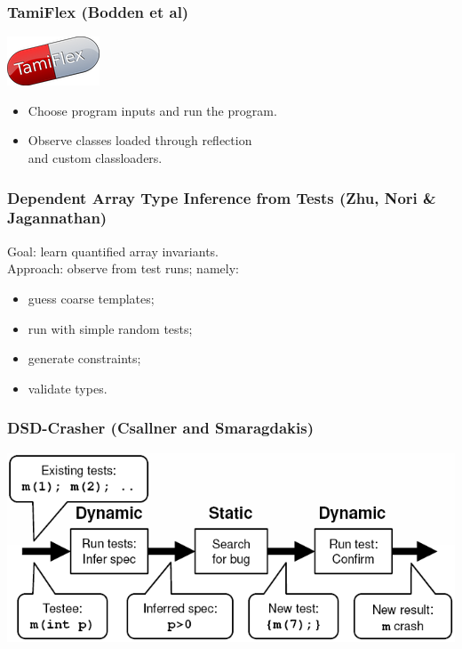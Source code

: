 \documentclass{beamer}
\newenvironment{changemargin}[1]{%
  \begin{list}{}{%
    \setlength{\topsep}{0pt}%
    \setlength{\leftmargin}{#1}%
    \setlength{\rightmargin}{1em}
    \setlength{\listparindent}{\parindent}%
    \setlength{\itemindent}{\parindent}%
    \setlength{\parsep}{\parskip}%
  }%
  \item[]}{\end{list}}
\begin{document}
\begin{frame}
  \frametitle{TamiFlex (Bodden et al)}

\begin{center}
\includegraphics[width=.2\textwidth]{images/tamiflex.png}
\end{center}

\Large
\begin{changemargin}{1cm}
\begin{itemize}
\item Choose program inputs and run the program.
\item Observe classes loaded through reflection \\
 \hspace*{2em} and custom classloaders.
\end{itemize}
\end{changemargin}

\end{frame}

\begin{frame}
  \frametitle{Dependent Array Type Inference from Tests (Zhu, Nori \& Jagannathan)}

\begin{changemargin}{1cm}
\Large
Goal: learn quantified array invariants.\\[1em]

Approach: observe from test runs; namely:
\begin{itemize}
\item guess coarse templates;
\item run with simple random tests;
\item generate constraints;
\item validate types.
\end{itemize}
\end{changemargin}
\end{frame}

\begin{frame}
  \frametitle{DSD-Crasher (Csallner and Smaragdakis)}

\begin{center}
\includegraphics[width=\textwidth]{images/dsd.png}
\end{center}
\end{frame}
\end{document}
